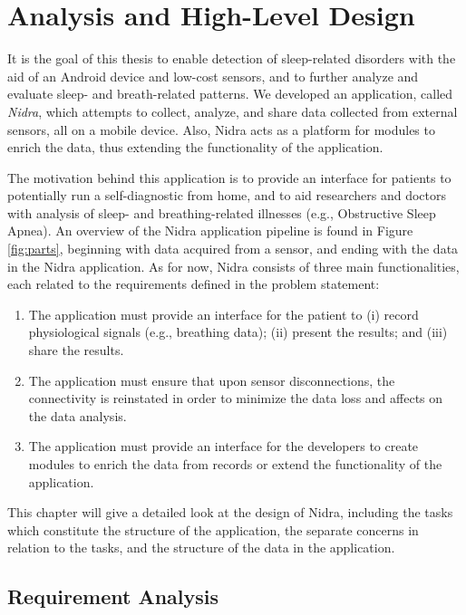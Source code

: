 
\chapter{Analysis and High-Level Design}

It is the goal of this thesis to enable detection of sleep-related disorders with the aid of an Android device and low-cost sensors, and to further analyze and evaluate sleep- and breath-related patterns. We developed an application, called \textit{Nidra}, which attempts to collect, analyze, and share data collected from external sensors, all on a mobile device. Also, Nidra acts as a platform for modules to enrich the data, thus extending the functionality of the application.

The motivation behind this application is to provide an interface for patients to potentially run a self-diagnostic from home, and to aid researchers and doctors with analysis of sleep- and breathing-related illnesses (e.g., Obstructive Sleep Apnea). An overview of the Nidra application pipeline is found in Figure \ref{fig:parts}, beginning with data acquired from a sensor, and ending with the data in the Nidra application. As for now, Nidra consists of three main functionalities, each related to the requirements defined in the problem statement: 

\begin{enumerate}
    \item The application must provide an interface for the patient to (i) record physiological signals (e.g., breathing data); (ii) present the results; and (iii) share the results.
    \item The application must ensure that upon sensor disconnections, the connectivity is reinstated in order to minimize the data loss and affects on the data analysis. 
    \item The application must provide an interface for the developers to create modules to enrich the data from records or extend the functionality of the application.
\end{enumerate}

This chapter will give a detailed look at the design of Nidra, including the tasks which constitute the structure of the application, the separate concerns in relation to the tasks, and the structure of the data in the application.

\section{Requirement Analysis}


